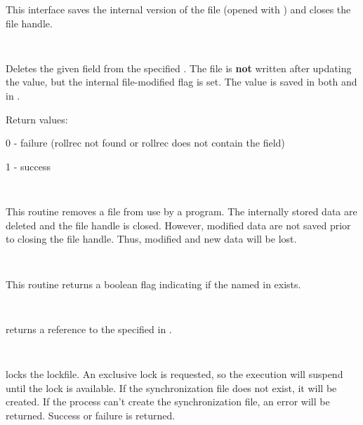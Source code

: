 \begin{description}
This interface saves the internal version of the  file (opened
with ) and closes the file handle.

\item {}\verb" "

Deletes the given field from the specified .  The file is {\bf
not} written after updating the value, but the internal file-modified flag is
set.  The value is saved in both  and in \var{\@rollreclines}.

Return values:

\begin{description}
\item 0 - failure (rollrec not found or rollrec does not contain the field)
\item 1 - success
\end{description}

\item {}\verb" "

This routine removes a  file from use by a program.  The
internally stored data are deleted and the  file handle is
closed.  However, modified data are not saved prior to closing the file
handle.  Thus, modified and new data will be lost.

\item {}\verb" "

This routine returns a boolean flag indicating if the  named
in  exists.

\item {}\verb" "

 returns a reference to the 
specified in .

\item {}\verb" "

 locks the  lockfile.  An exclusive lock
is requested, so the execution will suspend until the lock is available.  If
the  synchronization file does not exist, it will be created.
If the process can't create the synchronization file, an error will be
returned.  Success or failure is returned.

\item {}\verb" "


\end{description}
